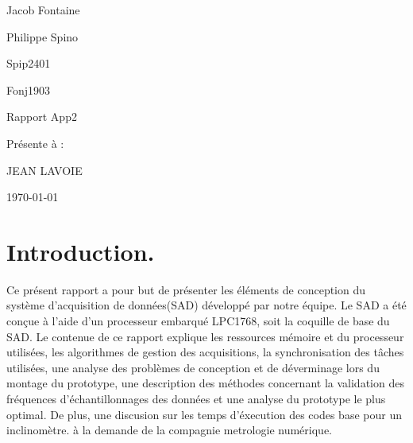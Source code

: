 \documentclass[12pt]{article}
\begin{document}
\begin{titlepage}
	\centering
	{\LARGE Jacob Fontaine \par
	 \LARGE Philippe Spino \par}
	\vspace{1cm}
	\small Spip2401\par
	\small Fonj1903\par 
	\vspace{3cm}
	{\Large Rapport App2\par}
	\vspace{5cm}
	{\Large Présente à :\par JEAN LAVOIE\par}
	\vspace{4cm}
	\vfill
	{\large \today\par}
\end{titlepage}
\newpage
\tableofcontents
{}
\newpage
{}
\setcounter{page}{1}
\onehalfspacing
\setlength{\parskip}{1em}
\section{Introduction.}
Ce présent rapport a pour but de présenter les éléments de conception du système d'acquisition de données(SAD) développé par notre équipe. Le SAD a été conçue à l'aide d'un processeur embarqué LPC1768, soit la coquille de base du SAD. Le contenue de ce rapport explique les ressources mémoire et du processeur utilisées, les algorithmes de gestion des acquisitions, la synchronisation des tâches utilisées, une analyse des problèmes de conception et de déverminage lors du montage du prototype, une description des méthodes concernant la validation des fréquences d'échantillonnages des données et une analyse du prototype le plus optimal. De plus, une discusion sur les temps d'éxecution des codes base pour un inclinomètre. à la demande de la compagnie metrologie numérique.
\end{document}
